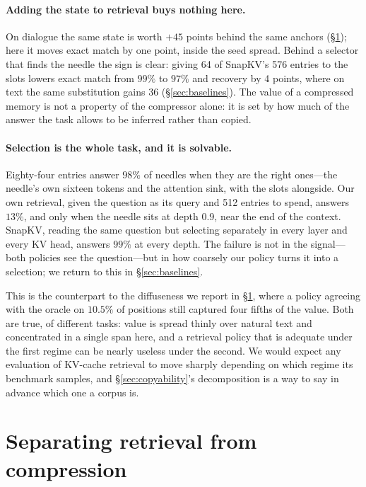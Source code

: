 \documentclass[11pt]{article}
\begin{document}
\paragraph{Adding the state to retrieval buys nothing here.} On dialogue the same
state is worth $+45$ points behind the same anchors (\S\ref{sec:decomposition});
here it moves exact match by one point, inside the seed spread. Behind a selector
that finds the needle the sign is clear: giving 64 of SnapKV's 576 entries to the
slots lowers exact match from $99\%$ to $97\%$ and recovery by 4 points, where on
text the same substitution gains 36 (\S\ref{sec:baselines}). The value of a
compressed memory is not a property of the compressor alone: it is set by how
much of the answer the task allows to be inferred rather than copied.

\paragraph{Selection is the whole task, and it is solvable.}
Eighty-four entries answer $98\%$ of needles when they are the right ones---the
needle's own sixteen tokens and the attention sink, with the slots alongside.
Our own retrieval, given the question as its query and 512 entries to spend,
answers $13\%$, and only when the needle sits at depth 0.9, near the end of the
context. SnapKV, reading the same question but selecting separately in every
layer and every KV head, answers $99\%$ at every depth. The failure is not in the
signal---both policies see the question---but in how coarsely our policy turns it
into a selection; we return to this in \S\ref{sec:baselines}.

This is the counterpart to the diffuseness we report in
\S\ref{sec:decomposition}, where a policy agreeing with the oracle on $10.5\%$ of
positions still captured four fifths of the value. Both are true, of different
tasks: value is spread thinly over natural text and concentrated in a single
span here, and a retrieval policy that is adequate under the first regime can be
nearly useless under the second. We would expect any evaluation of KV-cache
retrieval to move sharply depending on which regime its benchmark samples, and
\S\ref{sec:copyability}'s decomposition is a way to say in advance which one a
corpus is.

\section{Separating retrieval from compression}
\label{sec:decomposition}
\end{document}
